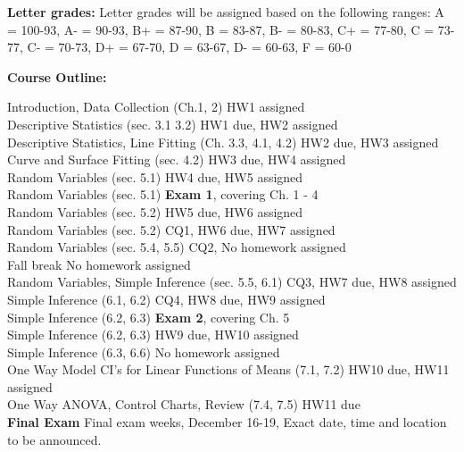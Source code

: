 \documentclass[12pt]{article}\usepackage[]{graphicx}\usepackage[]{color}
\begin{document}
\begin{center} 
\begin{minipage}{6.5in}
\begin{flushleft}
\textbf{Letter grades:} 
Letter grades will be assigned based on the following ranges: A = 100-93, A- = 90-93, B+ = 87-90, B = 83-87, B- = 80-83, C+ = 77-80, C = 73-77, C- = 70-73, D+ = 67-70, D = 63-67, D- = 60-63, F = 60-0
\end{flushleft}
\end{minipage}
\end{center}

\noindent\textbf{Course Outline:} 
\begin{center} \begin{minipage}{6.5in}
\begin{flushleft}
Introduction, Data Collection (Ch.1, 2) \dotfill HW1 assigned\\
Descriptive Statistics (sec. 3.1 3.2)  \dotfill HW1 due, HW2 assigned\\
Descriptive Statistics, Line Fitting  (Ch. 3.3, 4.1, 4.2) \dotfill HW2 due, HW3 assigned\\
Curve and Surface Fitting (sec. 4.2) \dotfill HW3 due, HW4 assigned \\
Random Variables (sec. 5.1) \dotfill HW4 due, HW5 assigned \\
Random Variables (sec. 5.1) \dotfill \textbf{Exam 1}, covering Ch. 1 - 4 \\
Random Variables (sec. 5.2) \dotfill HW5 due, HW6 assigned  \\
Random Variables (sec. 5.2) \dotfill CQ1, HW6 due, HW7 assigned  \\
Random Variables (sec. 5.4, 5.5) \dotfill CQ2, No homework assigned\\
Fall  break \dotfill No homework assigned \\
Random Variables, Simple Inference (sec. 5.5, 6.1) \dotfill CQ3, HW7 due, HW8 assigned \\
Simple Inference (6.1, 6.2) \dotfill CQ4, HW8 due, HW9 assigned  \\
Simple Inference (6.2, 6.3) \dotfill \textbf{Exam 2}, covering Ch. 5 \\
Simple Inference (6.2, 6.3) \dotfill HW9 due, HW10 assigned  \\
Simple Inference (6.3, 6.6) \dotfill No homework assigned\\
One Way Model CI's for Linear Functions of Means (7.1, 7.2) \dotfill HW10 due, HW11 assigned  \\
One Way ANOVA, Control Charts, Review (7.4, 7.5) \dotfill HW11 due \\
\textbf{Final Exam} \dotfill  Final exam weeks, December 16-19, Exact date, time and location to be announced.
\end{flushleft}
\end{minipage}
\end{center}
\end{document}
